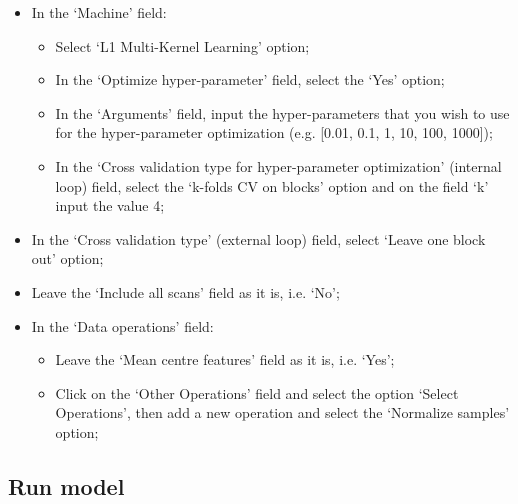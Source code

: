 \begin{itemize}
\begin{itemize}
		\end{itemize}			
		
	\item In the `Machine' field:
	
	\begin{itemize}
	\item Select `L1 Multi-Kernel Learning' option;	
	
	\item In the `Optimize hyper-parameter' field, select the `Yes' option;
	
	\item In the `Arguments' field, input the hyper-parameters that you wish to use for the hyper-parameter optimization (e.g. [0.01, 0.1, 1, 10, 100, 1000]);
	
	\item In the `Cross validation type for hyper-parameter optimization' (internal loop) field, select the `k-folds CV on blocks' option and on the field `k' input the value 4;
	
	\end{itemize}
	
	\item In the `Cross validation type' (external loop) field, select `Leave one block out' option;
	
	\item Leave the `Include all scans' field as it is, i.e. `No';

	\item In the `Data operations' field:
	
		\begin{itemize}
		\item  Leave the `Mean centre features' field as it is, i.e. `Yes'; 
				
		\item  Click on the `Other Operations' field and select the option `Select Operations', then add a new operation and select the `Normalize samples' option;
		\end{itemize}
	
\end{itemize}


\subsection{Run model}

